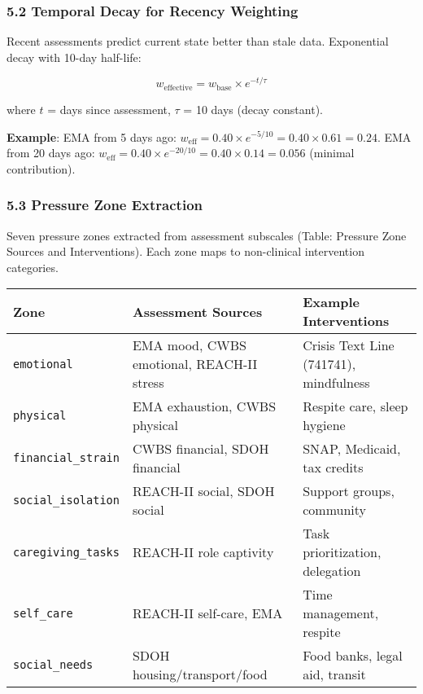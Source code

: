 \documentclass[
]{article}
\begin{document}
\subsubsection{5.2 Temporal Decay for Recency
Weighting}\label{temporal-decay-for-recency-weighting}

Recent assessments predict current state better than stale data.
Exponential decay with 10-day half-life:

\[w_{\text{effective}} = w_{\text{base}} \times e^{-t / \tau}\]

where \(t\) = days since assessment, \(\tau\) = 10 days (decay
constant).

\textbf{Example}: EMA from 5 days ago:
\(w_{\text{eff}} = 0.40 \times e^{-5/10} = 0.40 \times 0.61 = 0.24\).
EMA from 20 days ago:
\(w_{\text{eff}} = 0.40 \times e^{-20/10} = 0.40 \times 0.14 = 0.056\)
(minimal contribution).

\subsubsection{5.3 Pressure Zone
Extraction}\label{pressure-zone-extraction}

Seven pressure zones extracted from assessment subscales (Table:
Pressure Zone Sources and Interventions). Each zone maps to non-clinical
intervention categories.

\begin{longtable}[]{@{}
  >{\raggedright\arraybackslash}p{}
  >{\raggedright\arraybackslash}p{}
  >{\raggedright\arraybackslash}p{}@{}}
\toprule\noalign{}
\begin{minipage}[b]{\linewidth}\raggedright
Zone
\end{minipage} & \begin{minipage}[b]{\linewidth}\raggedright
Assessment Sources
\end{minipage} & \begin{minipage}[b]{\linewidth}\raggedright
Example Interventions
\end{minipage} \\
\midrule\noalign{}
\endhead
\bottomrule\noalign{}
\endlastfoot
\texttt{emotional} & EMA mood, CWBS emotional, REACH-II stress & Crisis
Text Line (741741), mindfulness \\
\texttt{physical} & EMA exhaustion, CWBS physical & Respite care, sleep
hygiene \\
\texttt{financial\_strain} & CWBS financial, SDOH financial & SNAP,
Medicaid, tax credits \\
\texttt{social\_isolation} & REACH-II social, SDOH social & Support
groups, community \\
\texttt{caregiving\_tasks} & REACH-II role captivity & Task
prioritization, delegation \\
\texttt{self\_care} & REACH-II self-care, EMA & Time management,
respite \\
\texttt{social\_needs} & SDOH housing/transport/food & Food banks, legal
aid, transit \\
\end{longtable}
\end{document}
